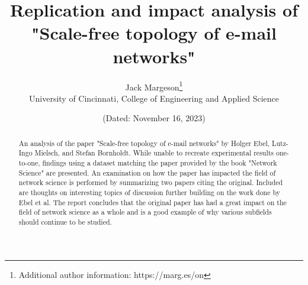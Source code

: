 \documentclass[11pt]{article}
\title{Replication and impact analysis of\\"Scale-free topology of e-mail networks" }
\author{Jack Margeson\thanks{Additional author information: https://marg.es/on}\\
University of Cincinnati, College of Engineering and Applied Science}
\date{\normalsize{(Dated: November 16, 2023)}}
\begin{document}
\maketitle

\vspace{-3mm} %

\begin{abstract}
\normalsize{An analysis of the paper "Scale-free topology of e-mail networks" by Holger Ebel, Lutz-Ingo Mielsch, and Stefan Bornholdt. While unable to recreate experimental results one-to-one, findings using a dataset matching the paper provided by the book "Network Science" are presented. An examination on how the paper has impacted the field of network science is performed by summarizing two papers citing the original. Included are thoughts on interesting topics of discussion further building on the work done by Ebel et al. The report concludes that the original paper has had a great impact on the field of network science as a whole and is a good example of why various subfields should continue to be studied.}
\end{abstract}

\vspace{5mm} %
\end{document}
